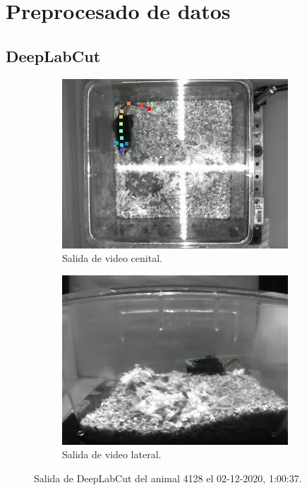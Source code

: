 \section{Preprocesado de datos}

\subsection{DeepLabCut}

\begin{figure}[H]
  \centering
  \begin{subfigure}{0.45\textwidth}
    \centering
    \includegraphics[width=\textwidth]{figures/deeplabcut-top-example-4128-2020-12-02-1-00-37.jpg}
    \caption{Salida de video cenital.}
    \label{fig:deeplabcut-top-example}
  \end{subfigure}
  \begin{subfigure}{0.45\textwidth}
    \centering
    \includegraphics[width=\textwidth]{figures/deeplabcut-lateral-example-4128-2020-12-02-1-00-37.jpg}
    \caption{Salida de video lateral.}
    \label{fig:deeplabcut-lateral-example}
  \end{subfigure}
  \caption{Salida de DeepLabCut del animal 4128 el 02-12-2020, 1:00:37.}
  \label{fig:deeplabcut-outputexamples}
\end{figure}

